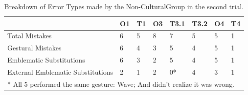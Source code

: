     \begin{table}[t]
    \begin{tabular}{llllllll}
    \cline{2-8}
    \multicolumn{1}{l|}{}                                   & \multicolumn{1}{l|}{O1} & \multicolumn{1}{l|}{T1} & \multicolumn{1}{l|}{O3} & \multicolumn{1}{l|}{T3.1} & \multicolumn{1}{l|}{T3.2} & \multicolumn{1}{l|}{O4} & \multicolumn{1}{l|}{T4} \\ \hline
    \multicolumn{1}{|l|}{Total Mistakes}                    & \multicolumn{1}{l|}{6}  & \multicolumn{1}{l|}{5}  & \multicolumn{1}{l|}{8}  & \multicolumn{1}{l|}{7}    & \multicolumn{1}{l|}{5}    & \multicolumn{1}{l|}{5}  & \multicolumn{1}{l|}{1}  \\ \hline
    \multicolumn{1}{|l|}{Gestural Mistakes}                 & \multicolumn{1}{l|}{6}  & \multicolumn{1}{l|}{4}  & \multicolumn{1}{l|}{3}  & \multicolumn{1}{l|}{5}    & \multicolumn{1}{l|}{4}    & \multicolumn{1}{l|}{5}  & \multicolumn{1}{l|}{1}  \\ \hline
    \multicolumn{1}{|l|}{Emblematic Substitutions}          & \multicolumn{1}{l|}{6}  & \multicolumn{1}{l|}{3}  & \multicolumn{1}{l|}{2}  & \multicolumn{1}{l|}{5}    & \multicolumn{1}{l|}{4}    & \multicolumn{1}{l|}{5}  & \multicolumn{1}{l|}{1}  \\ \hline
    \multicolumn{1}{|l|}{External Emblematic Substitutions} & \multicolumn{1}{l|}{2}  & \multicolumn{1}{l|}{1}  & \multicolumn{1}{l|}{2}  & \multicolumn{1}{l|}{0*}   & \multicolumn{1}{l|}{4}    & \multicolumn{1}{l|}{3}  & \multicolumn{1}{l|}{1}  \\ \hline
    \multicolumn{8}{l}{* All 5 performed the same gesture: Wave; And didn't realize it was wrong.}
    \end{tabular}
    \caption{\label{tab:Table_ErrorBreakdown}Breakdown of Error Types made by the Non-CulturalGroup in the second trial.}
    \end{table}
